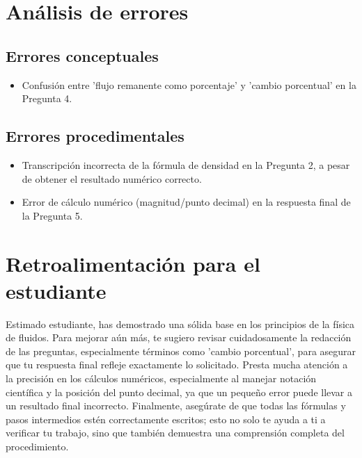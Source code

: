 \documentclass[11pt,a4paper]{article}
\begin{document}
\section*{Análisis de errores}

\subsection*{Errores conceptuales}
\begin{itemize}[leftmargin=1.5em, itemsep=2pt]
  \item Confusión entre 'flujo remanente como porcentaje' y 'cambio porcentual' en la Pregunta 4.
\end{itemize}

\subsection*{Errores procedimentales}
\begin{itemize}[leftmargin=1.5em, itemsep=2pt]
  \item Transcripción incorrecta de la fórmula de densidad en la Pregunta 2, a pesar de obtener el resultado numérico correcto.
  \item Error de cálculo numérico (magnitud/punto decimal) en la respuesta final de la Pregunta 5.
\end{itemize}

\section*{Retroalimentación para el estudiante}
\begin{tcolorbox}[cajaRecomendacion, title={Dirigido a: maria melendez 33685873}]
Estimado estudiante, has demostrado una sólida base en los principios de la física de fluidos. Para mejorar aún más, te sugiero revisar cuidadosamente la redacción de las preguntas, especialmente términos como 'cambio porcentual', para asegurar que tu respuesta final refleje exactamente lo solicitado. Presta mucha atención a la precisión en los cálculos numéricos, especialmente al manejar notación científica y la posición del punto decimal, ya que un pequeño error puede llevar a un resultado final incorrecto. Finalmente, asegúrate de que todas las fórmulas y pasos intermedios estén correctamente escritos; esto no solo te ayuda a ti a verificar tu trabajo, sino que también demuestra una comprensión completa del procedimiento.
\end{tcolorbox}
\end{document}
